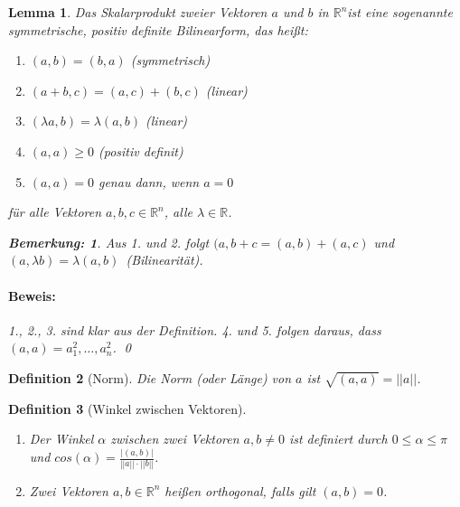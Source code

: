 \documentclass{report}
\newcommand{\lb}{\lambda}
\newcommand{\R}{\mathbb{R}}
\newcommand{\Rn}{\mathbb{R}^n}
\newcommand{\mRn}{\(\mathbb{R}^n\)}
\newcommand{\al}{\alpha}
\theoremstyle{customrem}
\newtheorem*{bemerkung}{Bemerkung\textnormal:}
\theoremstyle{customdef}
\newtheorem{definition}{Definition}[chapter]
\newtheorem{lemma}[definition]{Lemma}
\renewenvironment{proof}{\paragraph{Beweis: }}{\qed}
\theoremstyle{customenv}
\begin{document}
	\begin{lemma}
		Das Skalarprodukt zweier Vektoren \(a\) und \(b\) in \mRn ist eine sogenannte symmetrische, positiv definite Bilinearform, das heißt:
		\begin{enumerate}
			\item \((a, b) = (b, a)\) (symmetrisch) 
			\item \((a + b, c) = (a, c) + (b, c)\) (linear) 
			\item \((\lb a, b) = \lb(a, b)\) (linear) 
			\item \((a, a) \ge 0\) (positiv definit) 
			\item \((a, a) = 0\) genau dann, wenn \(a=0\) 
		\end{enumerate}
		für alle Vektoren \(a, b, c \in \Rn\), alle \(\lb \in \R\).\\
		\begin{bemerkung}
			Aus 1. und 2. folgt \((a, b+c = (a,b) + (a,c)\) und \((a, \lb b) = \lb (a, b)\)\ (Bilinearität).\\
		\end{bemerkung}
		
		\begin{proof}
			1., 2., 3. sind klar aus der Definition. 4. und 5. folgen daraus, dass \((a, a) = a_1^2, \ldots, a_n^2\).
		\end{proof}
	\end{lemma}
	\vspace{.2cm}
	\begin{definition}[Norm]
		Die Norm (oder Länge) von \(a\) ist \(\sqrt{(a, a)} = ||a||\).
	\end{definition}
	
	\begin{definition}[Winkel zwischen Vektoren]\( \)\vspace{-.5cm}
		\begin{enumerate}
			\item Der Winkel \(\al\) zwischen zwei Vektoren \(a, b \neq 0\) ist definiert durch \(0 \le \al \le \pi\) und \(cos(\al) = \frac{|(a,b)|}{||a||\cdot ||b||}\).
			\item Zwei Vektoren \(a, b \in \R^n\) heißen orthogonal, falls gilt \((a, b) = 0\).
		\end{enumerate}
	\end{definition}
	
\end{document}
